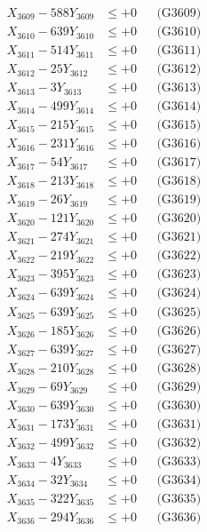 \documentclass[a4paper,10pt]{article}
\begin{document}
{\begin{align}
X_{3609} - 588Y_{3609} &\leq +0 && \text{(G3609)} \\
X_{3610} - 639Y_{3610} &\leq +0 && \text{(G3610)} \\
\allowbreak
X_{3611} - 514Y_{3611} &\leq +0 && \text{(G3611)} \\
X_{3612} - 25Y_{3612} &\leq +0 && \text{(G3612)} \\
X_{3613} - 3Y_{3613} &\leq +0 && \text{(G3613)} \\
X_{3614} - 499Y_{3614} &\leq +0 && \text{(G3614)} \\
X_{3615} - 215Y_{3615} &\leq +0 && \text{(G3615)} \\
X_{3616} - 231Y_{3616} &\leq +0 && \text{(G3616)} \\
X_{3617} - 54Y_{3617} &\leq +0 && \text{(G3617)} \\
X_{3618} - 213Y_{3618} &\leq +0 && \text{(G3618)} \\
X_{3619} - 26Y_{3619} &\leq +0 && \text{(G3619)} \\
X_{3620} - 121Y_{3620} &\leq +0 && \text{(G3620)} \\
\allowbreak
X_{3621} - 274Y_{3621} &\leq +0 && \text{(G3621)} \\
X_{3622} - 219Y_{3622} &\leq +0 && \text{(G3622)} \\
X_{3623} - 395Y_{3623} &\leq +0 && \text{(G3623)} \\
X_{3624} - 639Y_{3624} &\leq +0 && \text{(G3624)} \\
X_{3625} - 639Y_{3625} &\leq +0 && \text{(G3625)} \\
X_{3626} - 185Y_{3626} &\leq +0 && \text{(G3626)} \\
X_{3627} - 639Y_{3627} &\leq +0 && \text{(G3627)} \\
X_{3628} - 210Y_{3628} &\leq +0 && \text{(G3628)} \\
X_{3629} - 69Y_{3629} &\leq +0 && \text{(G3629)} \\
X_{3630} - 639Y_{3630} &\leq +0 && \text{(G3630)} \\
\allowbreak
X_{3631} - 173Y_{3631} &\leq +0 && \text{(G3631)} \\
X_{3632} - 499Y_{3632} &\leq +0 && \text{(G3632)} \\
X_{3633} - 4Y_{3633} &\leq +0 && \text{(G3633)} \\
X_{3634} - 32Y_{3634} &\leq +0 && \text{(G3634)} \\
X_{3635} - 322Y_{3635} &\leq +0 && \text{(G3635)} \\
X_{3636} - 294Y_{3636} &\leq +0 && \text{(G3636)} \\

\end{align}}
\end{document}
